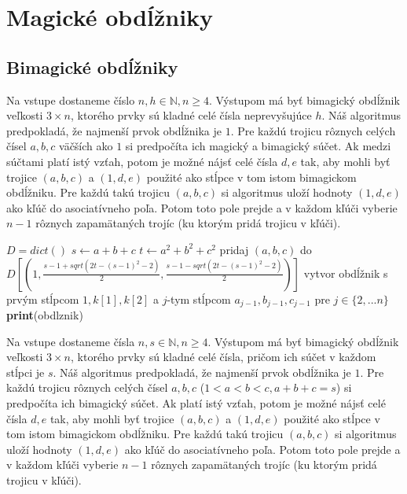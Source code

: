 \section{Magické obdĺžniky}

\subsection{Bimagické obdĺžniky}

\begin{subalg} Na vstupe dostaneme číslo $n,h \in \mathbb{N}, n \geq 4$. Výstupom má byť bimagický obdĺžnik veľkosti $3 \times n$, ktorého prvky sú kladné celé čísla neprevyšujúce $h$. Náš algoritmus predpokladá, že najmenší prvok obdĺžnika je $1$. Pre každú trojicu rôznych celých čísel $a,b,c$ väčších ako $1$ si predpočíta ich magický a bimagický súčet. Ak medzi súčtami platí istý vzťah, potom je možné nájsť celé čísla $d,e$ tak, aby mohli byť trojice $(a,b,c)$ a $(1,d,e)$ použité ako stĺpce v tom istom bimagickom obdĺžniku. Pre každú takú trojicu $(a,b,c)$ si algoritmus uloží hodnoty $(1,d,e)$ ako kľúč do asociatívneho poľa. Potom toto pole prejde a v každom kľúči vyberie $n-1$ rôznych zapamätaných trojíc (ku ktorým pridá trojicu v kľúči).
\end{subalg}

\begin{algorithmic}
\STATE $D = dict()$
			\STATE $s \gets a+b+c$
			\STATE $t \gets a^2+b^2+c^2$
				\STATE pridaj $(a,b,c)$ do $D[(1, \frac{s-1 + sqrt(2t - (s-1)^2 - 2)}{2}, \frac{s-1 - sqrt(2t - (s-1)^2 - 2)}{2})]$
			\ENDIF
		\ENDFOR
	\ENDFOR
\ENDFOR
{}
				\STATE vytvor obdĺžnik s prvým stĺpcom $1, k[1], k[2]$ a $j$-tym stĺpcom $a_{j-1}, b_{j-1}, c_{j-1}$ pre $j \in \{2, ... n\}$
					\STATE \textbf{print}(obdlznik)
				\ENDIF
			\ENDFOR
		\ENDIF
	\ENDFOR
\ENDFOR
\end{algorithmic}

\begin{subalg} Na vstupe dostaneme čísla $n,s \in \mathbb{N}, n \geq 4$. Výstupom má byť bimagický obdĺžnik veľkosti $3 \times n$, ktorého prvky sú kladné celé čísla, pričom ich súčet v každom stĺpci je $s$. Náš algoritmus predpokladá, že najmenší prvok obdĺžnika je $1$. Pre každú trojicu rôznych celých čísel $a,b,c$ ($1 < a < b < c, a+b+c = s$) si predpočíta ich bimagický súčet. Ak platí istý vzťah, potom je možné nájsť celé čísla $d,e$ tak, aby mohli byť trojice $(a,b,c)$ a $(1,d,e)$ použité ako stĺpce v tom istom bimagickom obdĺžniku. Pre každú takú trojicu $(a,b,c)$ si algoritmus uloží hodnoty $(1,d,e)$ ako kľúč do asociatívneho poľa. Potom toto pole prejde a v každom kľúči vyberie $n-1$ rôznych zapamätaných trojíc (ku ktorým pridá trojicu v kľúči).
\end{subalg}

